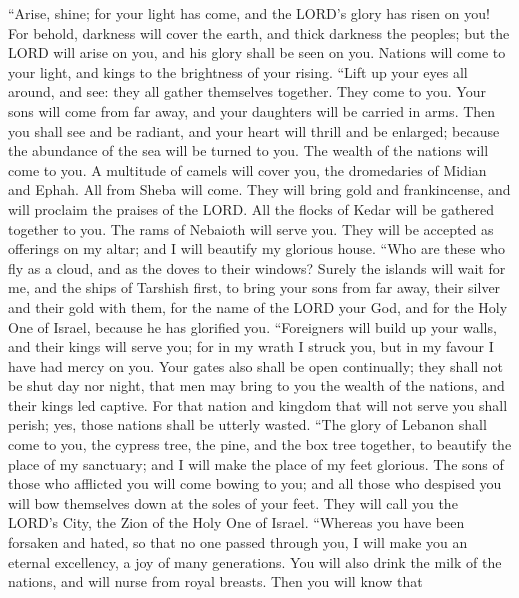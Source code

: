  ``Arise, shine; for your light has come, and the LORD's
glory has risen on you!  For behold, darkness will cover the
earth, and thick darkness the peoples; but the LORD will arise on you,
and his glory shall be seen on you.  Nations will come to
your light, and kings to the brightness of your rising. 
``Lift up your eyes all around, and see: they all gather themselves
together. They come to you. Your sons will come from far away, and your
daughters will be carried in arms.  Then you shall see and
be radiant, and your heart will thrill and be enlarged; because the
abundance of the sea will be turned to you. The wealth of the nations
will come to you.  A multitude of camels will cover you, the
dromedaries of Midian and Ephah. All from Sheba will come. They will
bring gold and frankincense, and will proclaim the praises of the LORD.
 All the flocks of Kedar will be gathered together to you.
The rams of Nebaioth will serve you. They will be accepted as offerings
on my altar; and I will beautify my glorious house.  ``Who
are these who fly as a cloud, and as the doves to their windows?
 Surely the islands will wait for me, and the ships of
Tarshish first, to bring your sons from far away, their silver and their
gold with them, for the name of the LORD your God, and for the Holy One
of Israel, because he has glorified you.  ``Foreigners will
build up your walls, and their kings will serve you; for in my wrath I
struck you, but in my favour I have had mercy on you.  Your
gates also shall be open continually; they shall not be shut day nor
night, that men may bring to you the wealth of the nations, and their
kings led captive.  For that nation and kingdom that will
not serve you shall perish; yes, those nations shall be utterly wasted.
 ``The glory of Lebanon shall come to you, the cypress
tree, the pine, and the box tree together, to beautify the place of my
sanctuary; and I will make the place of my feet glorious. 
The sons of those who afflicted you will come bowing to you; and all
those who despised you will bow themselves down at the soles of your
feet. They will call you the LORD's City, the Zion of the Holy One of
Israel.  ``Whereas you have been forsaken and hated, so
that no one passed through you, I will make you an eternal excellency, a
joy of many generations.  You will also drink the milk of
the nations, and will nurse from royal breasts. Then you will know that
